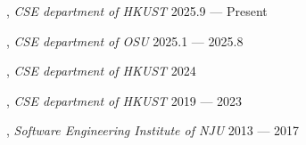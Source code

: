 , \textit{CSE department of HKUST} \hfill 2025.9 --- Present

, \textit{CSE department of OSU} \hfill 2025.1 --- 2025.8

, \textit{CSE department of HKUST} \hfill 2024

, \textit{CSE department of HKUST}	\hfill 2019 --- 2023


, \textit{Software Engineering Institute of NJU} \hfill    2013 --- 2017




